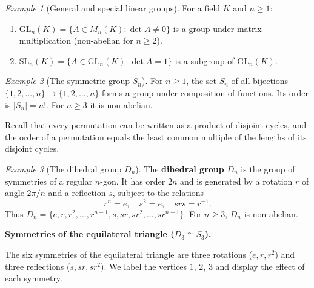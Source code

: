 \documentclass[12pt,a4paper,openany]{book}
\theoremstyle{definition}
\theoremstyle{remark}
\newtheorem{example}{Example}[chapter]
\begin{document}
\begin{example}[General and special linear groups]
\label{ex:GLn-SLn}
For a field $K$ and $n\ge 1$:
\begin{enumerate}[label=(\roman*)]
  \item $\text{GL}_n(K) = \{A\in M_n(K) : \det A\neq 0\}$ is a group under
    matrix multiplication (non-abelian for $n\ge 2$).
  \item $\text{SL}_n(K) = \{A\in\text{GL}_n(K) : \det A = 1\}$ is a
    subgroup of $\text{GL}_n(K)$.
\end{enumerate}
\end{example}

\begin{example}[The symmetric group $S_n$]
\label{ex:Sn}
For $n\ge 1$, the set $S_n$ of all bijections $\{1,2,\ldots,n\}\to
\{1,2,\ldots,n\}$ forms a group under composition of functions.  Its order
is $|S_n|=n!$.  For $n\ge 3$ it is non-abelian.

Recall that every permutation can be written as a product of disjoint
cycles, and the order of a permutation equals the
least common multiple of the lengths of its disjoint cycles.
\end{example}

\begin{example}[The dihedral group $D_n$]
\label{ex:Dn}
The \textbf{dihedral group} $D_n$ is the group of symmetries of a regular
$n$-gon.  It has order $2n$ and is generated by a rotation $r$ of angle
$2\pi/n$ and a reflection $s$, subject to the relations
\[
  r^n = e,\quad s^2 = e,\quad srs = r^{-1}.
\]
Thus $D_n = \{e,r,r^2,\ldots,r^{n-1},s,sr,sr^2,\ldots,sr^{n-1}\}$.  For
$n\ge 3$, $D_n$ is non-abelian.
\end{example}

\medskip

\noindent\textbf{Symmetries of the equilateral triangle ($D_3 \cong S_3$).}
\label{par:D3-tikz}

The six symmetries of the equilateral triangle are three rotations
($e, r, r^2$) and three reflections ($s, sr, sr^2$).  We label the vertices
$1$, $2$, $3$ and display the effect of each symmetry.
\end{document}
